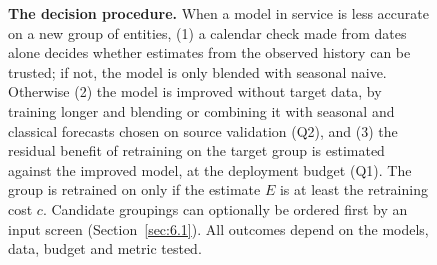 \begin{figure}[!t]
\begin{tikzpicture}
\end{tikzpicture}
\caption{\textbf{The decision procedure.} When a model in service is less accurate on a new group of entities, (1) a calendar check made from dates alone decides whether estimates from the observed history can be trusted; if not, the model is only blended with seasonal naive. Otherwise (2) the model is improved without target data, by training longer and blending or combining it with seasonal and classical forecasts chosen on source validation (Q2), and (3) the residual benefit of retraining on the target group is estimated against the improved model, at the deployment budget (Q1). The group is retrained on only if the estimate $E$ is at least the retraining cost $c$. Candidate groupings can optionally be ordered first by an input screen (Section~\ref{sec:6.1}). All outcomes depend on the models, data, budget and metric tested.}
\label{fig:1}
\end{figure}
